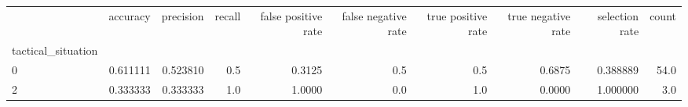 \begin{tabular}{lrrrrrrrrr}
\toprule
{} &  accuracy &  precision &  recall &  false positive rate &  false negative rate &  true positive rate &  true negative rate &  selection rate &  count \\
tactical\_situation &           &            &         &                      &                      &                     &                     &                 &        \\
\midrule
0                  &  0.611111 &   0.523810 &     0.5 &               0.3125 &                  0.5 &                 0.5 &              0.6875 &        0.388889 &   54.0 \\
2                  &  0.333333 &   0.333333 &     1.0 &               1.0000 &                  0.0 &                 1.0 &              0.0000 &        1.000000 &    3.0 \\
\bottomrule
\end{tabular}
